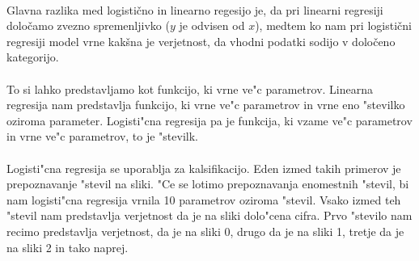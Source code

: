 \paragraph{}
Glavna razlika med logistično in linearno regesijo je, da pri linearni regresiji določamo zvezno spremenljivko ($y$ je odvisen od $x$), medtem ko nam pri logistični regresiji model vrne kakšna je verjetnost, da vhodni podatki sodijo v določeno kategorijo.

\paragraph{}
To si lahko predstavljamo kot funkcijo, ki vrne ve"c parametrov. Linearna regresija nam predstavlja funkcijo, ki vrne ve"c parametrov in vrne eno "stevilko oziroma parameter. Logisti"cna regresija pa je funkcija, ki vzame ve"c parametrov in vrne ve"c parametrov, to je "stevilk.

\paragraph{}
Logisti"cna regresija se uporablja za kalsifikacijo. Eden izmed takih primerov je prepoznavanje "stevil na sliki. "Ce se lotimo prepoznavanja enomestnih "stevil, bi nam logisti"cna regresija vrnila 10 parametrov oziroma "stevil. Vsako izmed teh "stevil nam predstavlja verjetnost da je na sliki dolo"cena cifra. Prvo "stevilo nam recimo predstavlja verjetnost, da je na sliki 0, drugo da je na sliki 1, tretje da je na sliki 2 in tako naprej.
